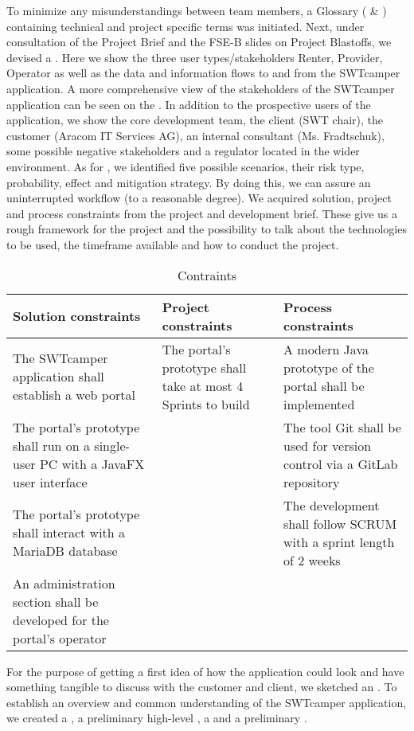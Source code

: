 To minimize any misunderstandings between team members, a Glossary ( \& ) containing technical and project specific terms was initiated.
Next, under consultation of the Project Brief and the FSE-B slides on Project Blastoffs, we devised a . Here we show the three user types/stakeholders Renter, Provider, Operator as well as the data and information flows to and from the SWTcamper application.
A more comprehensive view of the stakeholders of the SWTcamper application can be seen on the . In addition to the prospective users of the application, we show the core development team, the client (SWT chair), the customer (Aracom IT Services AG), an internal consultant (Ms. Fradtschuk), some possible negative stakeholders and a regulator located in the wider environment.
As for , we identified five possible scenarios, their risk type, probability, effect and mitigation strategy. By doing this, we can assure an uninterrupted workflow (to a reasonable degree).
We acquired solution, project and process constraints from the project and development brief. These give us a rough framework for the project and the possibility to talk about the technologies to be used, the timeframe available and how to conduct the project.

\begin{table}[h]
    \centering
    \caption{Contraints}
    \begin{tabular}{|p{4cm}|p{4cm}|p{4cm}|}
        \hline
        \textbf{Solution constraints} & \textbf{Project constraints} & \textbf{Process constraints} \\ \hline
        The SWTcamper application shall establish a web portal & The portal's prototype shall take at most 4 Sprints to build & A modern Java prototype of the portal shall be implemented \\ \hline
        The portal's prototype shall run on a single-user PC with a JavaFX user interface &  & The tool Git shall be used for version control via a GitLab repository \\ \hline
        The portal's prototype shall interact with a MariaDB database &  & The development shall follow SCRUM with a sprint length of 2 weeks \\ \hline
        An administration section shall be developed for the portal's operator &  &  \\ \hline
    \end{tabular}
\end{table}

For the purpose of getting a first idea of how the application could look and have something tangible to discuss with the customer and client, we sketched an .
To establish an overview and common understanding of the SWTcamper application, we created a  , a preliminary high-level , a  and a preliminary .